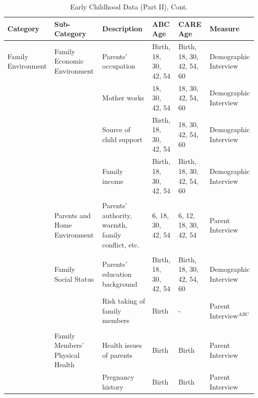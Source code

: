 \documentclass[static]{JJH-Beamer}
\begin{document}
\begin{frame}

\begin{table}[H]
\addtocounter{table}{-1}
\caption{Early Childhood Data (Part II), Cont.}
\begin{center}
\begin{tiny}
\begin{tabular}{L{1.3cm} C{1.8cm} C{2cm} C{1.3cm} C{1.3cm}  C{2cm}}
\toprule
\textbf{Category}	&	\textbf{Sub-Category}	&	\textbf{Description}	&	\textbf{ABC Age}  	&  \textbf{CARE Age}  & 	\textbf{Measure}	\\ \midrule
Family Environment	&	Family Economic Environment	&	Parents' occupation	&	Birth, 18, 30, 42, 54	& 	Birth, 18, 30, 42, 54, 60		&	Demographic Interview	\\
	&								& Mother works & 18, 30, 42, 54 & 18, 30, 42, 54, 60 & Demographic Interview \\
    &		&	Source of child support	&	Birth, 18, 30, 42, 54	&	18, 30, 42, 54, 60	&	Demographic Interview	\\
	&		&	Family income	&	Birth, 18, 30, 42, 54	&	Birth, 18, 30, 42, 54, 60	&	Demographic Interview	\\
	&	\\
	&	Parents and Home Environment & Parents' authority, warmth, family conflict, etc. & 6, 18, 30, 42, 54 & 6, 12, 18, 30, 42, 54 & Parent Interview \\
	&	\\
	&	Family Social Status	&	Parents' education background	&	Birth, 18, 30, 42, 54	&	Birth, 18, 30, 42, 54, 60		&	Demographic Interview	\\
	&		&	Risk taking of family members	&	Birth	&	- 	&	Parent Interview$^{ABC}$	\\
	&	\\
	&	Family Members' Physical Health	&	Health issues of parents	&	Birth	&	Birth	&	Parent Interview	\\
	&		&	Pregnancy history	&	Birth	&	Birth	&	Parent Interview	\\
\bottomrule
\end{tabular}
\end{tiny}
\end{center}
\end{table}

\end{frame}
\end{document}
